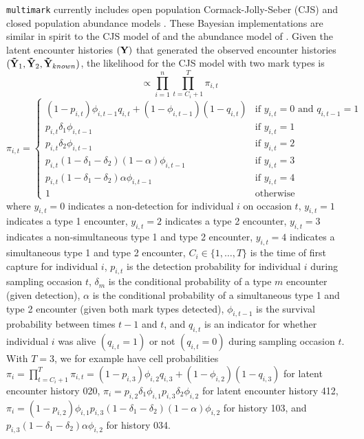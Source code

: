 \documentclass[12pt]{article}
\begin{document}
\verb|multimark| currently includes open population Cormack-Jolly-Seber (CJS) and closed population abundance models \citep[e.g.][]{WilliamsEtAl2002}. These Bayesian implementations are similar in spirit to the CJS model of \cite{Royle2008} and the abundance model of \cite{KingEtAl2015}. Given the latent encounter histories $({\bf Y})$ that generated the observed encounter histories $({\bf {\tilde Y}}_1, {\bf {\tilde Y}}_2, {\bf {\tilde Y}}_{known})$, the likelihood for the CJS model with two mark types is
\begin{equation}
  [ {\bf Y} \mid {\bf p}, {\boldsymbol \delta}, \alpha, \boldsymbol{\phi}, {\bf Q}] \propto \prod_{i=1}^{n} \prod_{t=C_i+1}^T \pi_{i,t}
  \label{eq:CJSlike}
\end{equation}
\begin{equation*}
  \pi_{i,t} = \begin{cases}
                \left( 1-p_{i,t} \right) \phi_{i,t-1} q_{i,t} + \left( 1-\phi_{i,t-1} \right) \left( 1- q_{i,t} \right)  & \text{if } y_{i,t}=0 \text{ and } q_{i,t-1}=1\\
                p_{i,t} \delta_1 \phi_{i,t-1}  & \text{if } y_{i,t}=1\\
                p_{i,t} \delta_2 \phi_{i,t-1}  & \text{if } y_{i,t}=2\\
                p_{i,t} \left( 1 - \delta_1 - \delta_2 \right) \left( 1 - \alpha \right) \phi_{i,t-1}  & \text{if } y_{i,t}=3\\
                p_{i,t} \left( 1 - \delta_1 - \delta_2 \right) \alpha \phi_{i,t-1}  & \text{if } y_{i,t}=4\\
                1 & \text{otherwise}
              \end{cases}
\end{equation*}
where $y_{i,t}=0$ indicates a non-detection for individual $i$ on occasion $t$, $y_{i,t}=1$ indicates a type 1 encounter, $y_{i,t}=2$ indicates a type 2 encounter, $y_{i,t}=3$ indicates a non-simultaneous type 1 and type 2 encounter, $y_{i,t}=4$ indicates a simultaneous type 1 and type 2 encounter, $C_i \in \{ 1,\ldots,T \}$ is the time of first capture for individual $i$, $p_{i,t}$ is the detection probability for individual $i$ during sampling occasion $t$, $\delta_m$ is the conditional probability of a type $m$ encounter (given detection), $\alpha$ is the conditional probability of a simultaneous type 1 and type 2 encounter (given both mark types detected), $\phi_{i,t-1}$ is the survival probability between times $t-1$ and $t$, and $q_{i,t}$ is an indicator for whether individual $i$ was alive $(q_{i,t}=1)$ or not $(q_{i,t}=0)$ during sampling occasion $t$. With $T=3$, we for example have cell probabilities $\pi_i= \prod_{t=C_i+1}^T \pi_{i,t} = \left(1-p_{i,3}\right) \phi_{i,2} q_{i,3} + \left(1- \phi_{i,2}\right)\left(1-q_{i,3}\right)$ for latent encounter history 020, $\pi_i= p_{i,2} \delta_1 \phi_{i,1} p_{i,3} \delta_2 \phi_{i,2}$ for latent encounter history 412, $\pi_i=\left(1-p_{i,2}\right) \phi_{i,1} p_{i,3} \left(1-\delta_1-\delta_2\right) \left(1-\alpha\right) \phi_{i,2}$ for history 103, and $p_{i,3} \left(1-\delta_1-\delta_2\right) \alpha \phi_{i,2}$ for history 034.
\end{document}
